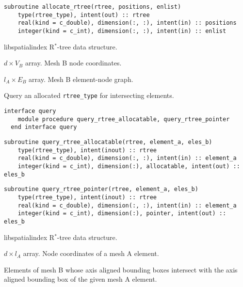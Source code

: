 \documentclass{article}
\begin{document}
\begin{lstlisting}[language=FORTRAN]  
  subroutine allocate_rtree(rtree, positions, enlist)
    type(rtree_type), intent(out) :: rtree
    real(kind = c_double), dimension(:, :), intent(in) :: positions
    integer(kind = c_int), dimension(:, :), intent(in) :: enlist
\end{lstlisting}

\begin{description}[font=\ttfamily\bfseries,leftmargin=2.2\parindent,labelindent=1.7\parindent,noitemsep]
  \item[rtree] libspatialindex R${}^*$-tree data structure.
  \item[positions] $d \times V_B$ array. Mesh B node coordinates.
  \item[enlist] $l_A \times E_B$ array. Mesh B element-node graph.
\end{description}

\noindent Query an allocated \verb+rtree_type+ for intersecting elements.
  
\begin{lstlisting}[language=FORTRAN]
  interface query
    module procedure query_rtree_allocatable, query_rtree_pointer
  end interface query
\end{lstlisting}
    
\begin{lstlisting}[language=FORTRAN]    
  subroutine query_rtree_allocatable(rtree, element_a, eles_b)
    type(rtree_type), intent(inout) :: rtree
    real(kind = c_double), dimension(:, :), intent(in) :: element_a
    integer(kind = c_int), dimension(:), allocatable, intent(out) :: eles_b
\end{lstlisting}
  
\begin{lstlisting}[language=FORTRAN]      
  subroutine query_rtree_pointer(rtree, element_a, eles_b)
    type(rtree_type), intent(inout) :: rtree
    real(kind = c_double), dimension(:, :), intent(in) :: element_a
    integer(kind = c_int), dimension(:), pointer, intent(out) :: eles_b
\end{lstlisting}

\begin{description}[font=\ttfamily\bfseries,leftmargin=2.2\parindent,labelindent=1.7\parindent,noitemsep]
  \item[rtree] libspatialindex R${}^*$-tree data structure.
  \item[element\_a] $d \times l_A$ array. Node coordinates of a mesh A element.
  \item[eles\_b] Elements of mesh B whose axis aligned bounding boxes intersect
    with the axis aligned bounding box of the given mesh A element.
\end{description}
\end{document}

